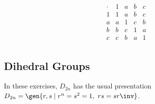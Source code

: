\begin{problems}
\begin{sol}
        $$\begin{array}{c|c|c|c|c}
            \cdot & 1 & a & b & c \\
            \hline
            1 & 1 & a & b & c \\
            \hline
            a & a & 1 & c & b \\
            \hline
            b & b & c & 1 & a \\
            \hline
            c & c & b & a & 1 \\
        \end{array}$$
    \end{sol}
\end{problems}

\newpage

\subsection{Dihedral Groups}

In these exercises, $D_{2n}$ has the usual presentation 
$D_{2n} = \gen{r, s \mid r^n = s^2 = 1, \ rs = sr\inv}$.

